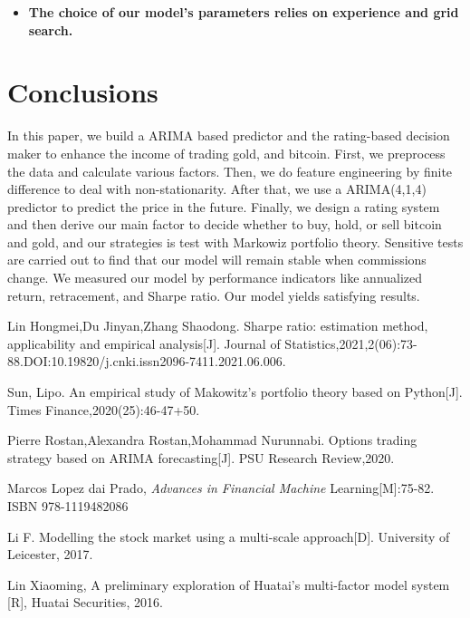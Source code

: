 \documentclass[12pt,a4paper]{article}
\newcommand{\Predictor}{ARIMA }
\begin{document}
\begin{spacing}{1.2}
\begin{itemize}
\item \textbf{The choice of our model's parameters relies on experience and grid search.}
\end{itemize}


\section{Conclusions}
\label{Conclusions}

In this paper, we build a \Predictor based predictor and the rating-based decision maker to enhance the income of trading gold, and bitcoin. First, we preprocess the data and calculate various factors. Then, we do feature engineering by finite difference to deal with non-stationarity. After that, we use a ARIMA(4,1,4) predictor to predict the price in the future. Finally, we design a rating system and then derive our main factor to decide whether to buy, hold, or sell bitcoin and gold, and our strategies is test with Markowiz portfolio theory. Sensitive tests  are carried out to find that our model will remain stable when commissions change. We measured our model by performance indicators like annualized return, retracement, and Sharpe ratio. Our model yields satisfying results.




\newpage
\begin{thebibliography}{00}


Lin Hongmei,Du Jinyan,Zhang Shaodong. Sharpe ratio: estimation method, applicability and empirical analysis[J]. Journal of Statistics,2021,2(06):73-88.DOI:10.19820/j.cnki.issn2096-7411.2021.06.006.

Sun, Lipo. An empirical study of Makowitz's portfolio theory based on Python[J]. Times Finance,2020(25):46-47+50.

Pierre Rostan,Alexandra Rostan,Mohammad Nurunnabi. Options trading strategy based on ARIMA forecasting[J]. PSU Research Review,2020.


Marcos Lopez dai Prado, \textit{Advances in Financial Machine} Learning[M]:75-82. ISBN 978-1119482086

Li F. Modelling the stock market using a multi-scale approach[D]. University of Leicester, 2017.

Lin Xiaoming, A preliminary exploration of Huatai's multi-factor model system [R], Huatai Securities, 2016.


\end{thebibliography}
\end{spacing}
\end{document}
